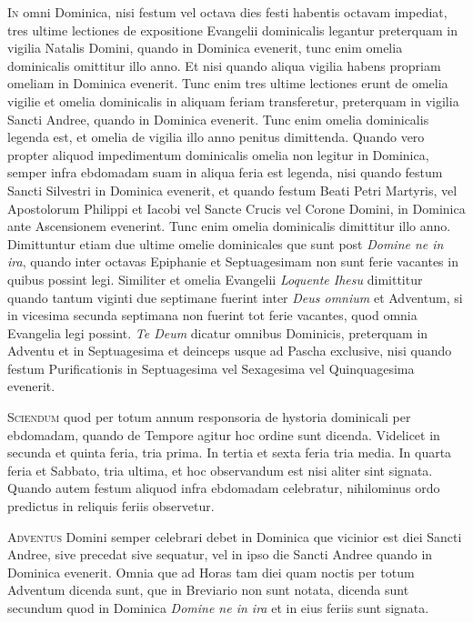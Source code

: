 \begin{multicols*}{2}
{\color{Red} }
\lettrine[lines=2]{\zallmancaps \color{Red} I}{n} omni Dominica, nisi festum vel octava dies festi habentis octavam impediat, tres ultime lectiones de expositione Evangelii dominicalis legantur preterquam in vigilia Natalis Domini, quando in Dominica evenerit, tunc enim omelia dominicalis omittitur illo anno. Et nisi quando aliqua vigilia habens propriam omeliam in Dominica evenerit. Tunc enim tres ultime lectiones erunt de omelia vigilie et omelia dominicalis in aliquam feriam transferetur, preterquam in vigilia Sancti Andree, quando in Dominica evenerit. Tunc enim omelia dominicalis legenda est, et omelia de vigilia illo anno penitus dimittenda. Quando vero propter aliquod impedimentum dominicalis omelia non legitur in Dominica, semper infra ebdomadam suam in aliqua feria est legenda, nisi quando festum Sancti Silvestri in Dominica evenerit, et quando festum Beati Petri Martyris, vel Apostolorum Philippi et Iacobi vel Sancte Crucis vel Corone Domini, in Dominica ante Ascensionem evenerint. Tunc enim omelia dominicalis dimittitur illo anno. Dimittuntur etiam due ultime omelie dominicales que sunt post \textit{Domine ne in ira}, quando inter octavas Epiphanie et Septuagesimam non sunt ferie vacantes in quibus possint legi. Similiter et omelia Evangelii \textit{Loquente Ihesu} dimittitur quando tantum viginti due septimane fuerint inter \textit{Deus omnium} et Adventum, si in vicesima secunda septimana non fuerint tot ferie vacantes, quod omnia Evangelia legi possint.
\textit{Te Deum} dicatur omnibus Dominicis, preterquam in Adventu et in Septuagesima et deinceps usque ad Pascha exclusive, nisi quando festum Purificationis in Septuagesima vel Sexagesima vel Quinquagesima evenerit.

{\color{Red} }
\lettrine[lines=2]{\zallmancaps \color{Blue} S}{ciendum} quod per totum annum responsoria de hystoria dominicali per ebdomadam, quando de Tempore agitur hoc ordine sunt dicenda. Videlicet in secunda et quinta feria, tria prima. In tertia et sexta feria tria media. In quarta feria et Sabbato, tria ultima, et hoc observandum est nisi aliter sint signata. Quando autem festum aliquod infra ebdomadam celebratur, nihilominus ordo predictus in reliquis feriis observetur.

{\color{Red} }
\lettrine[lines=2]{\zallmancaps \color{Red} A}{dventus} Domini semper celebrari debet in Dominica que vicinior est diei Sancti Andree, sive precedat sive sequatur, vel in ipso die Sancti Andree quando in Dominica evenerit.
Omnia que ad Horas tam diei quam noctis per totum Adventum dicenda sunt, que in Breviario non sunt notata, dicenda sunt secundum quod in Dominica \textit{Domine ne in ira} et in eius feriis sunt signata.


\end{multicols*}
